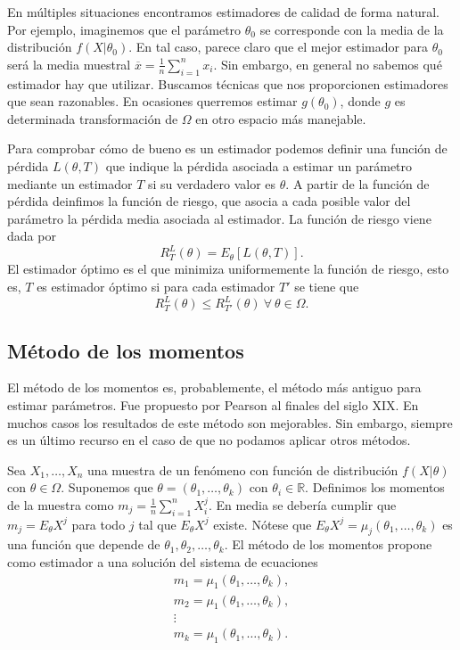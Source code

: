 \documentclass{article}
\begin{document}
En múltiples situaciones encontramos estimadores de calidad de forma natural. Por ejemplo, imaginemos que el parámetro $\theta_0$ se corresponde con la media de la distribución $f(X | \theta_0)$. En tal caso, parece claro que el mejor estimador para $\theta_0$ será la media muestral $\overline{x} = \frac{1}{n}\sum_{i = 1}^n x_i$. Sin embargo, en general no sabemos qué estimador hay que utilizar. Buscamos técnicas que nos proporcionen estimadores que sean razonables. En ocasiones querremos estimar $g(\theta_0)$, donde $g$ es determinada transformación de $\Omega$ en otro espacio más manejable.

Para comprobar cómo de bueno es un estimador podemos definir una función de pérdida $L(\theta,T)$ que indique la pérdida asociada a estimar un parámetro mediante un estimador $T$ si su verdadero valor es $\theta$. A partir de la función de pérdida deinfimos la función de riesgo, que asocia a cada posible valor del parámetro la pérdida media asociada al estimador. La función de riesgo viene dada por
\[ R^L_T(\theta) = E_\theta [L(\theta,T)].\]
El estimador óptimo es el que minimiza uniformemente la función de riesgo, esto es, $T$ es estimador óptimo si para cada estimador $T'$ se tiene que
\[ R^L_T(\theta) \leq R^L_{T'}(\theta) \ \forall \ \theta \in \Omega.\]

\subsection{Método de los momentos}

El método de los momentos es, probablemente, el método más antiguo para estimar parámetros. Fue propuesto por Pearson al finales del siglo XIX. En muchos casos los resultados de este método son mejorables. Sin embargo, siempre es un último recurso en el caso de que no podamos aplicar otros métodos.

Sea $X_1, \ldots, X_n$ una muestra de un fenómeno con función de distribución $f(X |\theta)$ con $\theta \in \Omega$. Suponemos que $\theta = (\theta_1, \ldots, \theta_k)$ con $\theta_i \in \mathbb{R}$. Definimos los momentos de la muestra como $m_j = \frac{1}{n} \sum_{i = 1}^n X_i^j$. En media se debería cumplir que $m_j = E_\theta X^j$ para todo $j$ tal que $E_\theta X^j$ existe. Nótese que $E_\theta X^j = \mu_j(\theta_1, \ldots, \theta_k)$ es una función que depende de $\theta_1, \theta_2, \ldots, \theta_k$. El método de los momentos propone como estimador a una solución del sistema de ecuaciones
\begin{equation} \label{eq:sistema-momentos}
    \begin{matrix}
        m_1 = \mu_1(\theta_1, \ldots, \theta_k), \\
        m_2 = \mu_1(\theta_1, \ldots, \theta_k), \\
        \vdots \\
        m_k = \mu_1(\theta_1, \ldots, \theta_k). \\
    \end{matrix}
\end{equation}
\end{document}

